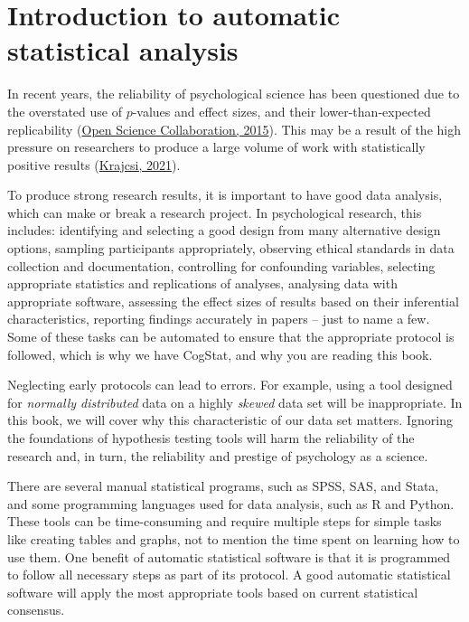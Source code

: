\documentclass[
  11pt,
]{book}
\theoremstyle{definition}
\theoremstyle{definition}
\theoremstyle{definition}
\theoremstyle{definition}
\theoremstyle{remark}
\begin{document}
\hypertarget{autostat}{%
\chapter{Introduction to automatic statistical analysis}\label{autostat}}

In recent years, the reliability of psychological science has been questioned due to the overstated use of \(p\)-values and effect sizes, and their lower-than-expected replicability (\protect\hyperlink{ref-open_science_collaboration_estimating_2015}{Open Science Collaboration, 2015}). This may be a result of the high pressure on researchers to produce a large volume of work with statistically positive results (\protect\hyperlink{ref-krajcsi_advancing_2021}{Krajcsi, 2021}).

To produce strong research results, it is important to have good data analysis, which can make or break a research project. In psychological research, this includes: identifying and selecting a good design from many alternative design options, sampling participants appropriately, observing ethical standards in data collection and documentation, controlling for confounding variables, selecting appropriate statistics and replications of analyses, analysing data with appropriate software, assessing the effect sizes of results based on their inferential characteristics, reporting findings accurately in papers -- just to name a few. Some of these tasks can be automated to ensure that the appropriate protocol is followed, which is why we have CogStat, and why you are reading this book.

Neglecting early protocols can lead to errors. For example, using a tool designed for \emph{normally distributed} data on a highly \emph{skewed} data set will be inappropriate. In this book, we will cover why this characteristic of our data set matters. Ignoring the foundations of hypothesis testing tools will harm the reliability of the research and, in turn, the reliability and prestige of psychology as a science.

There are several manual statistical programs, such as SPSS, SAS, and Stata, and some programming languages used for data analysis, such as R and Python. These tools can be time-consuming and require multiple steps for simple tasks like creating tables and graphs, not to mention the time spent on learning how to use them. One benefit of automatic statistical software is that it is programmed to follow all necessary steps as part of its protocol. A good automatic statistical software will apply the most appropriate tools based on current statistical consensus.
\end{document}
